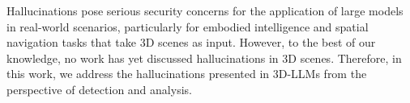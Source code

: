 Hallucinations pose serious security concerns for the application of large models in real-world scenarios, particularly for embodied intelligence and spatial navigation tasks that take 3D scenes as input. However, to the best of our knowledge, no work has yet discussed hallucinations in 3D scenes. Therefore, in this work, we address the hallucinations presented in 3D-LLMs from the perspective of detection and analysis.